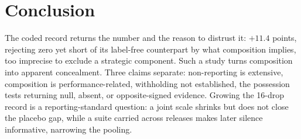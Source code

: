 \section{Conclusion}\label{sec:conclusion}

The coded record returns the number and the reason to distrust it: $+11.4$ points, rejecting zero yet short of its label-free counterpart by what composition implies, too imprecise to exclude a strategic component. Such a study turns composition into apparent concealment. Three claims separate: non-reporting is extensive, composition is performance-related, withholding not established, the possession tests returning null, absent, or opposite-signed evidence. Growing the 16-drop record is a reporting-standard question: a joint scale \citep{epoch2026rosetta} shrinks but does not close the placebo gap, while a suite carried across releases makes later silence informative, narrowing the \citet{dye1985} pooling.
